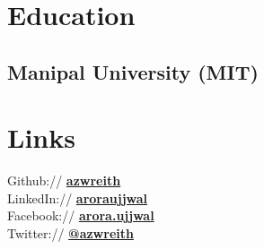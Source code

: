\documentclass[a4paper]{resume}
\begin{document}

\lastupdated %



\begin{minipage}[t]{0.33\textwidth} %


\section{Education}

\subsection{Manipal University (MIT)}




\section{Links}

Github:// \href{https://github.com/azwreith}{\bf azwreith} \\
LinkedIn:// \href{https://in.linkedin.com/in/aroraujjwal}{\bf aroraujjwal} \\
Facebook:// \href{https://www.facebook.com/arora.ujjwal}{\bf arora.ujjwal} \\
Twitter:// \href{https://twitter.com/DarthUjj}{\bf @azwreith} \\


\end{minipage}
\end{document}

